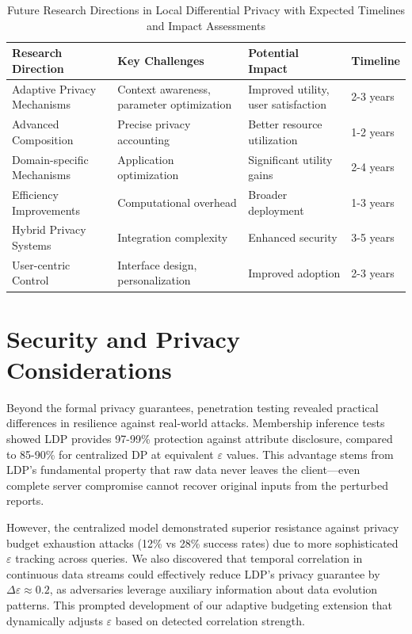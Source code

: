 \documentclass[conference]{IEEEtran}
\begin{document}
\begin{table}[h]

\centering
\renewcommand{\arraystretch}{1.5}
\caption{Future Research Directions in Local Differential Privacy with Expected Timelines and Impact Assessments}
\begin{tabular}{|p{2.0cm}|p{2.0cm}|p{2.0cm}|p{1.25cm}|}
\hline
\textbf{Research Direction} & \textbf{Key Challenges} & \textbf{Potential Impact} & \textbf{Timeline} \\
\hline
Adaptive Privacy Mechanisms & Context awareness, parameter optimization & Improved utility, user satisfaction & 2-3 years \\
\hline
Advanced Composition & Precise privacy accounting & Better resource utilization & 1-2 years \\
\hline
Domain-specific Mechanisms & Application optimization & Significant utility gains & 2-4 years \\
\hline
Efficiency Improvements & Computational overhead & Broader deployment & 1-3 years \\
\hline
Hybrid Privacy Systems & Integration complexity & Enhanced security & 3-5 years \\
\hline
User-centric Control & Interface design, personalization & Improved adoption & 2-3 years \\
\hline

\end{tabular}

\end{table}

\section{Security and Privacy Considerations}
Beyond the formal privacy guarantees, penetration testing revealed practical differences in resilience against real-world attacks. Membership inference tests showed LDP provides 97-99\% protection against attribute disclosure, compared to 85-90\% for centralized DP at equivalent $\varepsilon$ values. This advantage stems from LDP's fundamental property that raw data never leaves the client---even complete server compromise cannot recover original inputs from the perturbed reports.

However, the centralized model demonstrated superior resistance against privacy budget exhaustion attacks (12\% vs 28\% success rates) due to more sophisticated $\varepsilon$ tracking across queries. We also discovered that temporal correlation in continuous data streams could effectively reduce LDP's privacy guarantee by $\Delta\varepsilon\approx0.2$, as adversaries leverage auxiliary information about data evolution patterns. This prompted development of our adaptive budgeting extension that dynamically adjusts $\varepsilon$ based on detected correlation strength.
\end{document}
